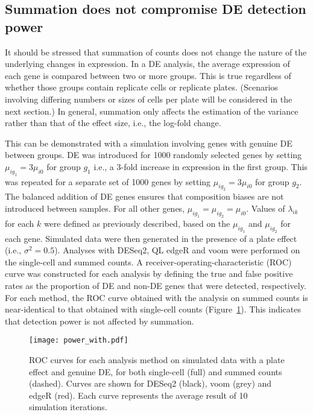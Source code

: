 \documentclass{article}
\begin{document}
\subsection{Summation does not compromise DE detection power}
It should be stressed that summation of counts does not change the nature of the underlying changes in expression.
In a DE analysis, the average expression of each gene is compared between two or more groups.
This is true regardless of whether those groups contain replicate cells or replicate plates. 
(Scenarios involving differing numbers or sizes of cells per plate will be considered in the next section.)
In general, summation only affects the estimation of the variance rather than that of the effect size, i.e., the log-fold change.

This can be demonstrated with a simulation involving genes with genuine DE between groups.
DE was introduced for 1000 randomly selected genes by setting $\mu_{ig_1} = 3\mu_{i0}$ for group $g_1$ i.e., a 3-fold increase in expression in the first group.
This was repeated for a separate set of 1000 genes by setting $\mu_{ig_2} = 3\mu_{i0}$ for group $g_2$.
The balanced addition of DE genes ensures that composition biases \cite{robinson2010scaling} are not introduced between samples.
For all other genes, $\mu_{ig_1}=\mu_{ig_2}=\mu_{i0}$.
Values of $\lambda_{ik}$ for each $k$ were defined as previously described, based on the $\mu_{ig_1}$ and $\mu_{ig_2}$ for each gene.
Simulated data were then generated in the presence of a plate effect (i.e., $\sigma^2=0.5$).
Analyses with DESeq2, QL edgeR and voom were performed on the single-cell and summed counts.
A receiver-operating-characteristic (ROC) curve was constructed for each analysis by defining the true and false positive rates as the proportion of DE and non-DE genes that were detected, respectively.
For each method, the ROC curve obtained with the analysis on summed counts is near-identical to that obtained with single-cell counts (Figure~\ref{fig:roc}).
This indicates that detection power is not affected by summation.

\begin{figure}[tbp]
\begin{center}
\texttt{[image: power\_with.pdf]}
\end{center}
\caption{
    ROC curves for each analysis method on simulated data with a plate effect and genuine DE, for both single-cell (full) and summed counts (dashed).
    Curves are shown for DESeq2 (black), voom (grey) and edgeR (red).
    Each curve represents the average result of 10 simulation iterations.
}
\label{fig:roc}
\end{figure}
\end{document}
